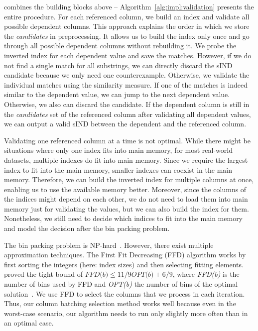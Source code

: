 \sawfish combines the building blocks above --
Algorithm~\ref{alg:impl:validation} presents the entire procedure.
For each referenced column, we build an index and validate all possible dependent columns.
This approach explains the order in which we store the \textit{candidates} in preprocessing.
It allows us to build the index only once and go through all possible dependent columns without rebuilding it.
We probe the inverted index for each dependent value and save the matches.
However, if we do not find a single match for all substrings, we can directly discard the sIND candidate because we only need one counterexample. 
Otherwise, we validate the individual matches using the similarity measure.
If one of the matches is indeed similar to the dependent value, we can jump to the next dependent value.
Otherwise, we also can discard the candidate.
If the dependent column is still in the \textit{candidates} set of the referenced column after validating all dependent values, we can output a valid sIND between the dependent and the referenced column.

Validating one referenced column at a time is not optimal.
While there might be situations where only one index fits into main memory, for most real-world datasets, multiple indexes do fit into main memory.
Since we require the largest index to fit into the main memory, smaller indexes can coexist in the main memory.
Therefore, we can build the inverted index for multiple columns at once, enabling us to use the available memory better.
Moreover, since the columns of the indices might depend on each other, we do not need to load them into main memory just for validating the values, but we can also build the index for them.  
Nonetheless, we still need to decide which indices to fit into the main memory and model the decision after the bin packing problem.

The bin packing problem is NP-hard~\cite{MARTELLO199059}.
However, there exist multiple approximation techniques.
The First Fit Decreasing (FFD) algorithm works by first sorting the integers (here: index sizes) and then selecting fitting elements.
\citeauthor{gyorgy2007FFD} proved the tight bound of $\textit{FFD(b)} \leq 11/9\textit{OPT(b)} + 6/9$, where \textit{FFD(b)} is the number of bins used by FFD and \textit{OPT(b)} the number of bins of the optimal solution~\cite{gyorgy2007FFD}.
We use FFD to select the columns that we process in each iteration.
Thus, our column batching selection method works well because even in the worst-case scenario, our algorithm needs to run only slightly more often than in an optimal case.


